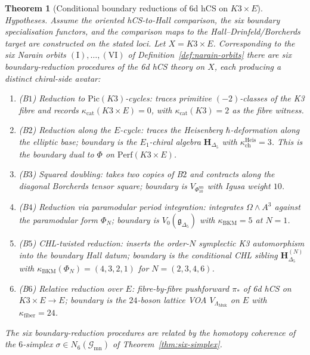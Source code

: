 \documentclass[11pt]{article}
\newtheorem{theorem}{Theorem}[section]
\begin{document}
\begin{theorem}[Conditional boundary reductions of 6d hCS on $K3 \times E$]
\label{thm:six-reductions}
\noindent\emph{Hypotheses.} Assume the oriented hCS-to-Hall comparison,
the six boundary specialisation functors, and the comparison maps to
the Hall--Drinfeld/Borcherds target are constructed on the stated
loci.
Let $X = K3 \times E$. Corresponding to the six Narain orbits
$(\mathrm I), \ldots, (\mathrm{VI})$ of
Definition~\ref{def:narain-orbits} there are six boundary-reduction
procedures of the 6d hCS theory on $X$, each producing a distinct
chiral-side avatar:
\begin{enumerate}[label=(B\arabic*)]
\item (B$1$) Reduction to $\mathrm{Pic}(K3)$-cycles: traces primitive
$(-2)$-classes of the K3 fibre and records
$\kappa_{\mathrm{cat}}(K3\times E)=0$, with
$\kappa_{\mathrm{cat}}(K3)=2$ as the fibre witness.
\item (B$2$) Reduction along the $E$-cycle: traces the Heisenberg
$\hbar$-deformation along the elliptic base; boundary is the
$E_1$-chiral algebra $\mathbf H_{\Delta_5}$ with
$\kappa_{\mathrm{ch}}^{\mathrm{Heis}} = 3$. This is the boundary
dual to $\Phi$ on $\mathrm{Perf}(K3 \times E)$.
\item (B$3$) Squared doubling: takes two copies of B$2$ and contracts
along the diagonal Borcherds tensor square; boundary is
$V_{\Phi_{10}^{\mathrm{un}}}$ with Igusa weight $10$.
\item (B$4$) Reduction via paramodular period integration:
integrates $\Omega \wedge A^3$ against the paramodular form $\Phi_N$;
boundary is $V_0(\mathfrak g_{\Delta_5})$ with
$\kappa_{\mathrm{BKM}} = 5$ at $N = 1$.
\item (B$5$) CHL-twisted reduction: inserts the order-$N$
symplectic K3 automorphism into the boundary Hall datum; boundary is
the conditional CHL sibling $\mathbf H_{\Delta_5}^{(N)}$ with
$\kappa_{\mathrm{BKM}}(\Phi_N)=(4,3,2,1)$ for
$N=(2,3,4,6)$.
\item (B$6$) Relative reduction over $E$: fibre-by-fibre pushforward
$\pi_\ast$ of 6d hCS on $K3 \times E \to E$; boundary is the
$24$-boson lattice VOA $V_{\Lambda_{\mathrm{Muk}}}$ on $E$ with
$\kappa_{\mathrm{fiber}} = 24$.
\end{enumerate}
The six boundary-reduction procedures are related by the homotopy
coherence of the $6$-simplex $\sigma \in N_6(\mathcal G_{\mathrm{mn}})$
of Theorem~\ref{thm:six-simplex}.
\end{theorem}
\end{document}
